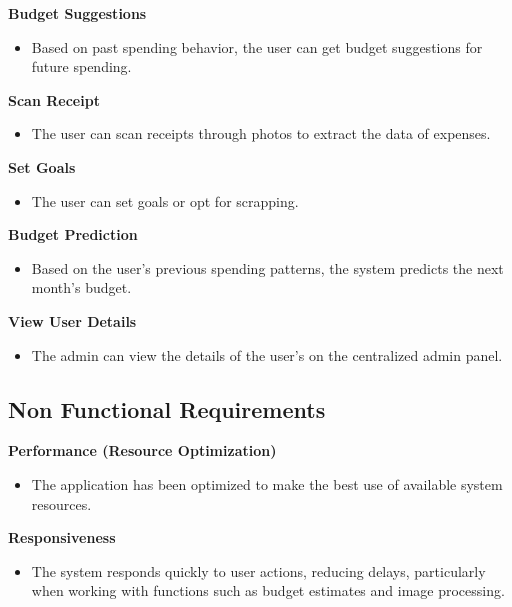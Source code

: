 \documentclass[12pt]{article}
\begin{document}
\textbf{Budget Suggestions}
\begin{itemize}
    \item Based on past spending behavior, the user can get budget suggestions for future spending.
\end{itemize}

\textbf{Scan Receipt}
\begin{itemize}
    \item The user can scan receipts through photos to extract the data of expenses.
\end{itemize}

\textbf{Set Goals}
\begin{itemize}
    \item The user can set goals or opt for scrapping.
\end{itemize}

\textbf{Budget Prediction}
\begin{itemize}
    \item Based on the user’s previous spending patterns, the system predicts the next month’s budget.
\end{itemize}

\textbf{View User Details}
\begin{itemize}
    \item The admin can view the details of the user’s on the centralized admin panel.
\end{itemize}
\vspace{1 cm} %

\noindent
\subsection{Non Functional Requirements}

\vspace{0.5cm} %
\noindent
\normalsize

\textbf{Performance (Resource Optimization)}
\begin{itemize}
    \item The application has been optimized to make the best use of available system resources.
\end{itemize}

\textbf{Responsiveness}
\begin{itemize}
    \item The system responds quickly to user actions, reducing delays, particularly when working with functions such as budget estimates and image processing.
\end{itemize}
\end{document}
